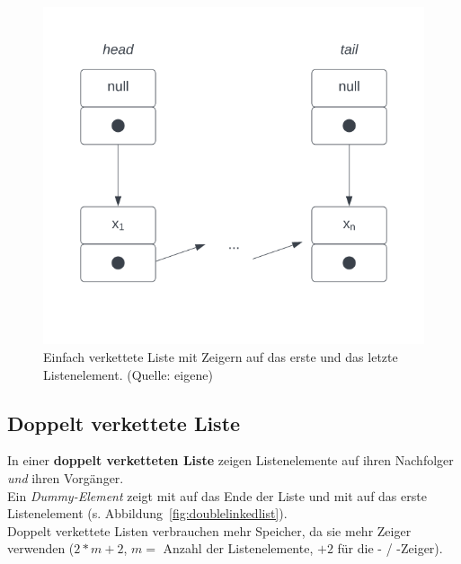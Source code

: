 \begin{figure}
    \begin{center}
        \includegraphics[scale=0.4]{chapters/Datenstrukturen und Algorithmen/img/linkedlist}
        \caption{Einfach verkettete Liste mit Zeigern auf das erste und das letzte Listenelement. (Quelle: eigene)}
        \label{fig:linkedlist}
    \end{center}
\end{figure}

\subsection{Doppelt verkettete Liste}
In einer \textbf{doppelt verketteten Liste} zeigen Listenelemente auf ihren Nachfolger \textit{und} ihren Vorgänger.\\

\noindent
Ein \textit{Dummy-Element}  zeigt mit  auf das Ende der Liste und mit  auf das erste Listenelement (s. Abbildung~\ref{fig:doublelinkedlist}).\\

\noindent
Doppelt verkettete Listen verbrauchen mehr Speicher, da sie mehr Zeiger verwenden ($2*m + 2$, $m = $ Anzahl der Listenelemente, $+2$ für die - / -Zeiger).

